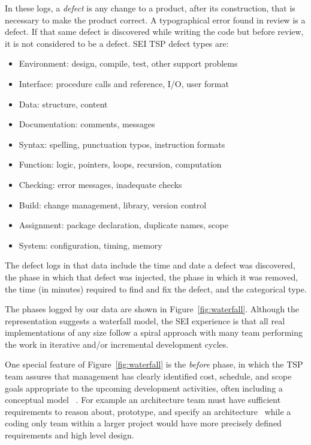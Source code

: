\documentclass[smallcondesed]{svjour3}
\newcommand{\fig}[1]{Figure~\ref{fig:#1}}
\begin{document}
In these logs, a  \emph{defect} is any change to a product, after its construction, that is necessary to make the product correct.  A typographical error found in review is a defect. If that same defect is discovered while writing the code but before review, it is not considered to be a defect. 
SEI TSP defect types are:
\begin{itemize}
\item Environment: design, compile, test,  other support  problems
\item Interface: procedure calls and reference, I/O, user format
\item Data: structure, content
\item Documentation: comments, messages
\item Syntax: spelling, punctuation typos, instruction formats
\item Function: logic, pointers, loops, recursion, computation  
\item Checking: error messages, inadequate checks
\item Build: change management, library, version control
\item Assignment: package
declaration, duplicate names, scope
\item System: configuration, timing, memory
\end{itemize}
The defect logs in that data  include the time and date a defect was discovered, the phase in which that defect was injected, the phase in which it was removed, the time (in minutes) required to find and fix the defect, and the categorical type.

The phases logged by our data are shown in \fig{waterfall}.
 Although the representation suggests a waterfall model, the SEI experience is that all real implementations of any size follow a spiral approach with many team performing the work in iterative and/or incremental development cycles.

One special feature of  \fig{waterfall} is
the {\em before} phase, in which the TSP team assures that management has clearly identified cost, schedule, and scope goals appropriate to the upcoming development activities, often including a conceptual model ~\cite{Humphrey:2005}. For example an architecture team must have sufficient requirements to reason about, prototype, and specify an architecture~\cite{Bachmann13} while a coding only team within a larger project would have more precisely defined requirements and high level design.
 
\end{document}
